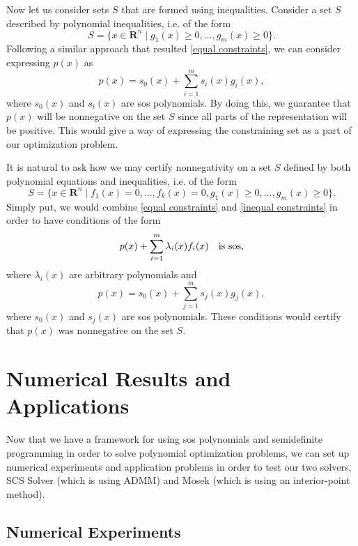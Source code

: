 	Now let us consider sets $S$ that are formed using inequalities. Consider a set $S$ described by polynomial inequalities, i.e. of the form
	$$
	S = \{x \in \mathbf{R}^n \mid g_1(x) \geq 0, \dots, g_m(x) \geq 0\}.
	$$
	Following a similar approach that resulted \eqref{equal constraints}, we can consider expressing $p(x)$ as 
	\begin{equation} \label{inequal constraints}
		p(x) = s_0 (x) + \sum_{i=1}^{m} s_i (x) g_i (x),
	\end{equation}
	where $s_0 (x)$ and $s_i (x)$ are sos polynomials. By doing this, we guarantee that $p(x)$ will be nonnegative on the set $S$ since all parts of the representation will be positive. This would give a way of expressing the constraining set as a part of our optimization problem.
	
	It is natural to ask how we may certify nonnegativity on a set $S$ defined by both polynomial equations and inequalities, i.e. of the form 
	$$
	S = \{x \in \mathbf{R}^n \mid f_1 (x) = 0, \dots, f_k (x) = 0, g_1 (x) \geq 0, \dots, g_m (x) \geq 0\}.
	$$
	Simply put, we would combine \eqref{equal constraints} and \eqref{inequal constraints} in order to have conditions of the form
	\begin{equation}
		p(x) + \sum_{i=1}^{m} \lambda_i(x) f_i(x) \quad \textnormal{is sos},
	\end{equation}
	where $\lambda_i (x)$ are arbitrary polynomials and 
	\begin{equation}
		p(x) = s_0 (x) + \sum_{j=1}^{m} s_j (x) g_j (x),
	\end{equation}
	where $s_0 (x)$ and $s_j (x)$ are sos polynomials. These conditions would certify that $p(x)$ was nonnegative on the set $S$.
	
	\section{Numerical Results and Applications}
	
	Now that we have a framework for using sos polynomials and semidefinite programming in order to solve polynomial optimization problems, we can set up numerical experiments and application problems in order to test our two solvers, SCS Solver (which is using ADMM) and Mosek (which is using an interior-point method).
	
		\subsection{Numerical Experiments}
		
